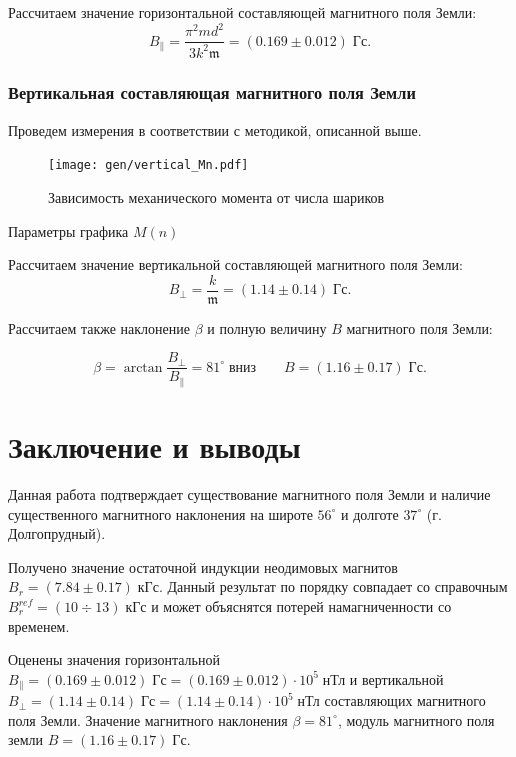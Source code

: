 \documentclass[12pt,a4paper]{article}
\begin{document}
	Рассчитаем значение горизонтальной составляющей магнитного поля Земли:
	$$ B_{\parallel} = \dfrac{\pi^2 m d^2}{3k^2\mathfrak{m}} = (0.169 \pm 0.012) \; \text{Гс}. $$
	
	\subsubsection*{Вертикальная составляющая магнитного поля Земли}
	
	Проведем измерения в соответствии с методикой, описанной выше.
	
	
	\begin{figure}[H]
		\texttt{[image: gen/vertical\_Mn.pdf]}
		\caption{Зависимость механического момента от числа шариков}
	\end{figure}
	
	\begin{table}[H]
		\caption{Параметры графика $M(n)$}
		
	\end{table}
	
	Рассчитаем значение вертикальной составляющей магнитного поля Земли:
	$$ B_{\perp} = \frac{k}{\mathfrak{m}} = (1.14 \pm 0.14) \; \text{Гс}. $$
	
	Рассчитаем также наклонение $\beta$ и полную величину $B$ магнитного поля Земли:
	
	$$ \beta = \arctan{\frac{B_\perp}{B_\parallel}} = 81 ^\circ \; \text{вниз} \qquad B = (1.16 \pm 0.17) \; \text{Гс}.$$
	\section*{Заключение и выводы}
	
	Данная работа подтверждает существование магнитного поля Земли и наличие существенного магнитного наклонения на широте $56 ^\circ$ и долготе $37 ^\circ$ (г. Долгопрудный).
	
	Получено значение остаточной индукции неодимовых магнитов $B_r = (7.84 \pm 0.17) \; \text{кГс}$. Данный результат по порядку совпадает со справочным $B_r^{ref} = (10 \div 13) \; \text{кГс}$ и может объяснятся потерей намагниченности со временем.
	
	Оценены значения горизонтальной $B_\parallel = (0.169 \pm 0.012) \; \text{Гс} = (0.169 \pm 0.012) \cdot 10^5 \; \text{нТл}$ и вертикальной $ B_{\perp} = (1.14 \pm 0.14) \; \text{Гс} = (1.14 \pm 0.14) \cdot 10^5 \; \text{нТл}$ составляющих магнитного поля Земли. Значение магнитного наклонения $\beta = 81 ^\circ$, модуль магнитного поля земли $B = (1.16 \pm 0.17) \; \text{Гс}$.
	
\end{document}
